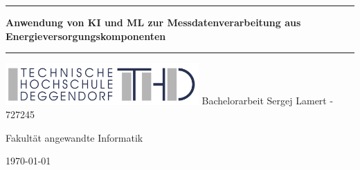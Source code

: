 \thispagestyle{empty} %

\newcommand{\Rule}{\rule{\textwidth}{1mm}}
\begin{center}
    \Rule\vspace{5mm}
    \sffamily\bfseries\Huge
    Anwendung von KI und ML zur Messdatenverarbeitung aus Energieversorgungskomponenten
    \vspace{1mm}\Rule
    \vfill  %
    \includegraphics[height=16mm]{Pictures/THD-Logo.pdf}
    \vfill
    \LARGE Bachelorarbeit
    \vfill
    \Large Sergej Lamert - 727245 \par
    Fakultät angewandte Informatik \par
    \vfill
    \today
    
\end{center}